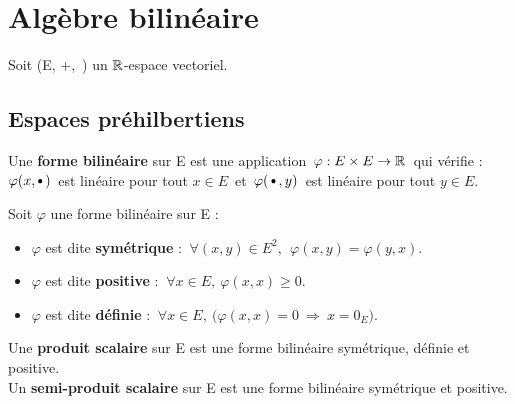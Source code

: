 \section{Algèbre bilinéaire}

\vspace{0.4cm}

\begin{center}
    Soit (E, +,\ \x) un \(\mathbb{R}\)-espace vectoriel.
\end{center}

\vspace{0.2cm}
\subsection{Espaces préhilbertiens}

\vspace{0.8cm}

Une \textbf{forme bilinéaire} sur E est une application \(\,\varphi :E\times E\to \mathbb{R}\,\) qui vérifie : \vspace{0.1cm}\\
\(\varphi(x,\sbullet[0.75]\,)\,\) est linéaire pour tout \(x\in E\,\) et \(\,\varphi(\,\sbullet[0.75]\,,y)\,\) est linéaire pour tout \(y\in E.\)

\vspace{1cm}

\noindent Soit \(\varphi\) une forme bilinéaire sur E :\vspace{0.1cm}
\begin{itemize}[leftmargin=1.5cm, label=•]\vspace{-0.1cm}
    \item \(\varphi\) est dite \textbf{symétrique} \ssi : \(\ \forall (x,y)\in E^2,\ \ \varphi(x,y)=\varphi(y,x). \)\vspace{0.1cm}

    \item \(\varphi\) est dite \textbf{positive} \ssi : \(\ \forall x\in E,\ \varphi(x,x)\geq 0. \)\vspace{0.1cm}

    \item \(\varphi\) est dite \textbf{définie} \ssi : \(\ \forall x\in E,\ \bigl(\varphi(x,x)=0 \ \Rightarrow \ x=0_E\bigr). \)
\end{itemize}

\vspace{1cm}

\noindent Une \textbf{produit scalaire} sur E est une forme bilinéaire symétrique, définie et positive.\\
Un \textbf{semi-produit scalaire} sur E est une forme bilinéaire symétrique et positive.

